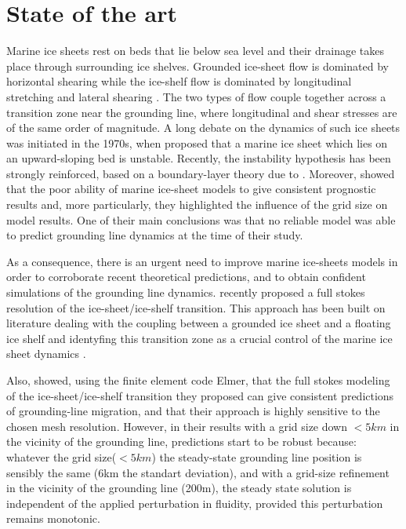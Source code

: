 \documentclass[a4paper,12pt]{article}
\begin{document}
\section{State of the art}
Marine ice sheets rest on beds that lie below sea level and their drainage takes place through surrounding ice shelves. Grounded ice-sheet flow is dominated by horizontal shearing while the ice-shelf flow is dominated by longitudinal stretching and lateral shearing \cite[]{durand2009full}. The two types of flow couple together across a transition zone near the grounding line, where longitudinal and shear stresses are of the same order of magnitude. A long debate on the dynamics of such ice sheets was initiated in the 1970s, when \cite{weertman1974stability} proposed that a marine ice sheet which lies on an upward-sloping bed is unstable. Recently, the instability hypothesis has been strongly reinforced, based on a boundary-layer theory due to \cite{schoof2007ice}. Moreover, \cite{vieli2005assessing} showed that the poor ability of marine ice-sheet models to give consistent prognostic results and, more particularly, they highlighted the influence of the grid size on model results. One of their main conclusions was that no reliable model was able to predict grounding line dynamics at the time of their study.

As a consequence, there is an urgent need to improve marine ice-sheets models in order to corroborate recent theoretical predictions, and to obtain confident simulations of the grounding line dynamics. \cite{durand2009marine} recently proposed a full stokes resolution of the ice-sheet/ice-shelf transition. This approach has been built on literature dealing with the coupling between a grounded ice sheet and a floating ice shelf and identyfing this transition zone as a crucial control of the marine ice sheet dynamics \cite[]{weertman1974stability,van1985response,chugunov1996modelling,hindmarsh1996stability,vieli2005assessing,schoof2007ice,schoof2007marine}.

Also, \cite{durand2009full} showed, using the finite element code Elmer, that the full stokes modeling of the ice-sheet/ice-shelf transition they proposed can give consistent predictions of grounding-line migration, and that their approach is highly sensitive to the chosen mesh resolution. However, in their results with a grid size down $<5 km$ in the vicinity of the grounding line, predictions start to be robust because: whatever the grid size($<5km$) the steady-state grounding line position is sensibly the same (6km the standart deviation), and with a grid-size refinement in the vicinity of the grounding line (200m), the steady state solution is independent of the applied perturbation in fluidity, provided this perturbation remains monotonic.
\end{document}
